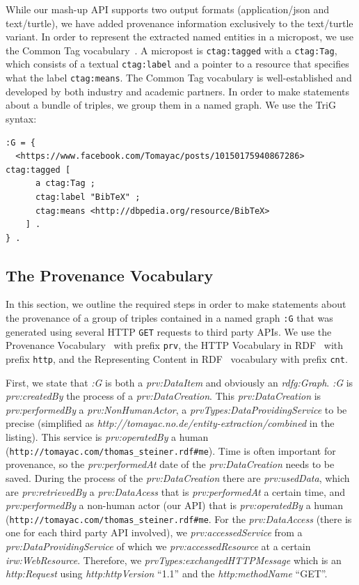 While our mash-up API supports two output formats (application/json and text/turtle), we have added provenance information exclusively to the text/turtle variant. In order to represent the extracted named entities in a micropost, we use the Common Tag vocabulary~\cite{CommonTag:Spec}. A micropost is \texttt{ctag:tagged} with a \texttt{ctag:Tag}, which consists of a textual \texttt{ctag:label} and a pointer to a resource that specifies what the label \texttt{ctag:means}. The Common Tag vocabulary is well-established and developed by both industry and academic partners. In order to make statements about a bundle of triples, we group them in a named graph. We use the TriG~\cite{Bizer:TriG} syntax:

\begin{lstlisting}
:G = {
  <https://www.facebook.com/Tomayac/posts/10150175940867286> ctag:tagged [
      a ctag:Tag ;
      ctag:label "BibTeX" ;
      ctag:means <http://dbpedia.org/resource/BibTeX>
    ] .
} .
\end{lstlisting}

\subsection{The Provenance Vocabulary}                                      \label{sec:provenance}
In this section, we outline the required steps in order to make statements about the provenance of a group of triples contained in a named graph \texttt{:G} that was generated using several HTTP \texttt{GET} requests to third party APIs. We use the Provenance Vocabulary~\cite{Hartig:Provenance} with prefix \texttt{prv}, the HTTP Vocabulary in RDF~\cite{HTTP:RDF} with prefix \texttt{http}, and the Representing Content in RDF~\cite{CNT:RDF} vocabulary with prefix \texttt{cnt}.

First, we state that \emph{:G} is both a \emph{prv:DataItem} and obviously an \emph{rdfg:Graph}. \emph{:G} is \emph{prv:createdBy} the process of a \emph{prv:DataCreation}. This \emph{prv:DataCreation} is \emph{prv:performedBy} a \emph{prv:NonHumanActor}, a \emph{prvTypes:DataProvidingService} to be precise (simplified as \emph{http://tomayac.no.de/entity-extraction/combined} in the listing). This service is \emph{prv:operatedBy} a human (\texttt{http://tomayac.com/thomas\_steiner.rdf\#me}). Time is often important for provenance, so the \emph{prv:performedAt} date of the \emph{prv:DataCreation} needs to be saved. During the process of the \emph{prv:DataCreation} there are \emph{prv:usedData}, which are \emph{prv:retrievedBy} a \emph{prv:DataAcess} that is \emph{prv:performedAt} a certain time, and \emph{prv:performedBy} a non-human actor (our API) that is \emph{prv:operatedBy} a human (\texttt{http://tomayac.com/thomas\_steiner.rdf\#me}. For the \emph{prv:DataAccess} (there is one for each third party API involved), we \emph{prv:accessedService} from a \emph{prv:DataProvidingService} of which we \emph{prv:accessedResource} at a certain \emph{irw:WebResource}. Therefore, we \emph{prvTypes:exchangedHTTPMessage} which is an \emph{http:Request} using \emph{http:httpVersion} ``1.1'' and the \emph{http:methodName} ``GET''.

